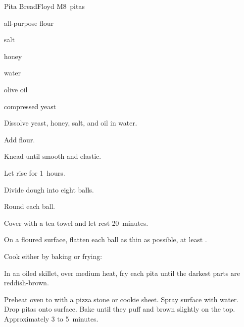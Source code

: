 \begin{recipe}{Pita Bread}{Floyd M}{8~pitas}

\begin{ingredients}
\item {} all-purpose flour
\item {} salt
\item {} honey
\item {} water
\item {} olive oil
\item {} compressed yeast
\end{ingredients}

\begin{directions}
\item Dissolve yeast, honey, salt, and oil in water.
\item Add flour.
\item Knead until smooth and elastic.
\item Let rise for 1\half{}~hours.
\item Divide dough into eight balls.
\item Round each ball.
\item Cover with a tea towel and let rest 20~minutes.
\item On a floured surface, flatten each ball as thin as possible, at least \inch{\quarter}.
\item Cook either by baking or frying:
\begin{itemize*}
\item In an oiled skillet, over medium heat, fry each pita until the darkest parts are reddish-brown.
\item Preheat oven to  with a pizza stone or cookie sheet. Spray surface with water. Drop pitas onto surface. Bake until they puff and brown slightly on the top. Approximately 3 to 5~minutes.
\end{itemize*}
\end{directions}

\end{recipe}
